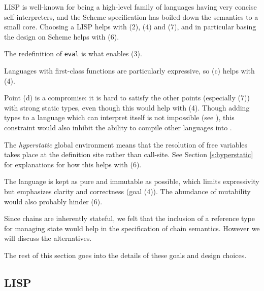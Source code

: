 LISP is well-known for being a high-level family of languages having very concise
self-interpreters, and the Scheme specification has boiled down the
semantics to a small core. Choosing a LISP helps with (2), (4) and (7), and in
particular basing the design on Scheme helps with (6).

The redefinition of \texttt{eval} is what enables (3).

Languages with first-class functions are particularly expressive, so (c) helps
with (4).


Point (d) is a compromise: it is hard to satisfy the other points (especially
(7)) with strong static types, even though this would help with (4). Though
adding types to a language which can interpret itself is not impossible (see
\cite{brown-papers}), this constraint would also inhibit the ability to
compile other languages into \rad{}.

The \emph{hyperstatic} global environment means that the resolution of free
variables takes place at the definition site rather than call-site. See Section
\ref{s:hyperstatic} for explanations for how this helps with (6).

The language is kept as pure and immutable as possible, which limits
expressivity but emphasizes clarity and correctness (goal (4)). The abundance of
mutability would also probably hinder (6).

Since chains are inherently stateful, we felt that the inclusion of a reference
type for managing state would help in the specification of chain semantics.
However we will discuss the alternatives.

The rest of this section goes into the details of these goals and
design choices.


\subsection{LISP}

